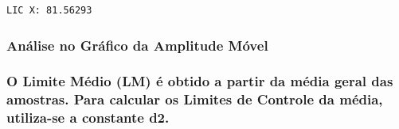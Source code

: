 \documentclass[
  letterpaper,
  DIV=11,
  numbers=noendperiod]{scrartcl}
\begin{document}
\begin{verbatim}
LIC X: 81.56293 
\end{verbatim}

\subsubsection{Análise no Gráfico da Amplitude
Móvel}\label{anuxe1lise-no-gruxe1fico-da-amplitude-muxf3vel}

\subsubsection{O Limite Médio (LM) é obtido a partir da média geral das
amostras. Para calcular os Limites de Controle da média, utiliza-se a
constante
d2.}\label{o-limite-muxe9dio-lm-uxe9-obtido-a-partir-da-muxe9dia-geral-das-amostras.-para-calcular-os-limites-de-controle-da-muxe9dia-utiliza-se-a-constante-d2.-1}
\end{document}
